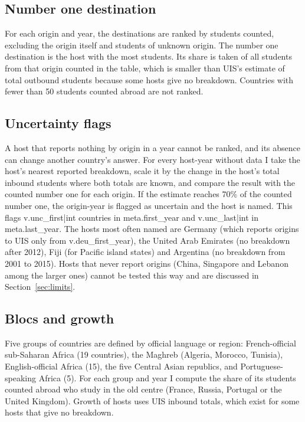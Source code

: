 \documentclass[11pt,a4paper]{article}
\begin{document}
\subsection{Number one destination}

For each origin and year, the destinations are ranked by students counted, excluding the origin itself and students of unknown origin. The number one destination is the host with the most students. Its share is taken of all students from that origin counted in the table, which is smaller than UIS's estimate of total outbound students because some hosts give no breakdown. Countries with fewer than 50 students counted abroad are not ranked.

\subsection{Uncertainty flags}

A host that reports nothing by origin in a year cannot be ranked, and its absence can change another country's answer. For every host-year without data I take the host's nearest reported breakdown, scale it by the change in the host's total inbound students where both totals are known, and compare the result with the counted number one for each origin. If the estimate reaches 70\% of the counted number one, the origin-year is flagged as uncertain and the host is named. This flags {{v.unc_first|int}} countries in {{meta.first_year}} and {{v.unc_last|int}} in {{meta.last_year}}. The hosts most often named are Germany (which reports origins to UIS only from {{v.deu_first_year}}), the United Arab Emirates (no breakdown after 2012), Fiji (for Pacific island states) and Argentina (no breakdown from 2001 to 2015). Hosts that never report origins (China, Singapore and Lebanon among the larger ones) cannot be tested this way and are discussed in Section~\ref{sec:limits}.

\subsection{Blocs and growth}

Five groups of countries are defined by official language or region: French-official sub-Saharan Africa (19 countries), the Maghreb (Algeria, Morocco, Tunisia), English-official Africa (15), the five Central Asian republics, and Portuguese-speaking Africa (5). For each group and year I compute the share of its students counted abroad who study in the old centre (France, Russia, Portugal or the United Kingdom). Growth of hosts uses UIS inbound totals, which exist for some hosts that give no breakdown.
\end{document}
